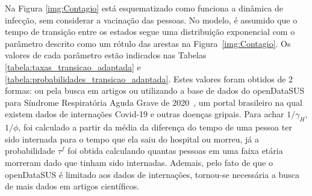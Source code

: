 Na Figura \ref{img:Contagio} está esquematizado como funciona a dinâmica de infecção, sem considerar a vacinação das pessoas. 
No modelo, é assumido que o tempo de transição entre os estados segue uma distribuição exponencial com o parâmetro descrito como um rótulo das arestas na Figura~\ref{img:Contagio}. Os valores de cada parâmetro estão indicados nas Tabelas \ref{tabela:taxas_transicao_adaptada} e \ref{tabela:probabilidades_transicao_adaptada}.
Estes valores foram obtidos de 2 formas: ou pela busca em artigos ou utilizando a base de dados do openDataSUS para Síndrome Respiratória Aguda Grave de 2020~\cite{openDataSUSs}, um portal brasileiro na qual existem dados de internações Covid-19 e outras doenças gripais. Para achar $1/\gamma_H$, $1/\phi$, foi calculado a partir da média da diferença do tempo de uma pessoa ter sido internada para o tempo que ela saiu do hospital ou morreu, já a probabilidade $\tau^f$ foi obtida calculando quantas pessoas em uma faixa etária morreram dado que tinham sido internadas. Ademais, pelo fato de que o openDataSUS é limitado aos dados de internações, tornou-se necessária a busca de mais dados em artigos científicos.


